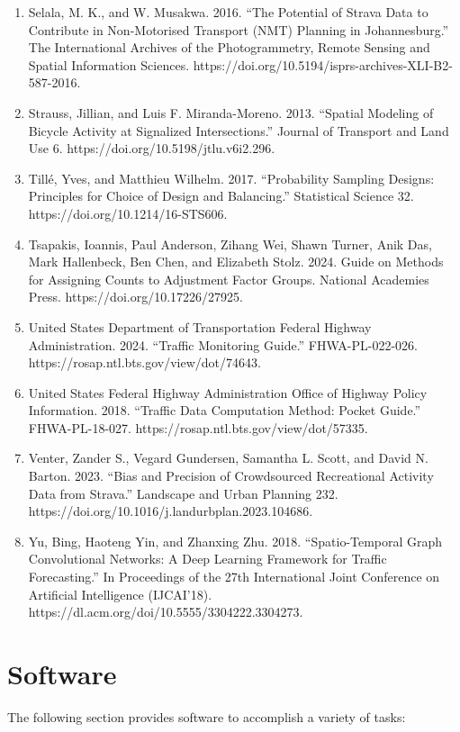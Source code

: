 \documentclass[11pt]{article}
\begin{document}
\begin{enumerate}
\item
  Selala, M. K., and W. Musakwa. 2016. ``The Potential of Strava Data to
  Contribute in Non-Motorised Transport (NMT) Planning in
  Johannesburg.'' The International Archives of the Photogrammetry,
  Remote Sensing and Spatial Information Sciences.
  https://doi.org/10.5194/isprs-archives-XLI-B2-587-2016.
\item
  Strauss, Jillian, and Luis F. Miranda-Moreno. 2013. ``Spatial Modeling
  of Bicycle Activity at Signalized Intersections.'' Journal of
  Transport and Land Use 6. https://doi.org/10.5198/jtlu.v6i2.296.
\item
  Tillé, Yves, and Matthieu Wilhelm. 2017. ``Probability Sampling
  Designs: Principles for Choice of Design and Balancing.'' Statistical
  Science 32. https://doi.org/10.1214/16-STS606.
\item
  Tsapakis, Ioannis, Paul Anderson, Zihang Wei, Shawn Turner, Anik Das,
  Mark Hallenbeck, Ben Chen, and Elizabeth Stolz. 2024. Guide on Methods
  for Assigning Counts to Adjustment Factor Groups. National Academies
  Press. https://doi.org/10.17226/27925.
\item
  United States Department of Transportation Federal Highway
  Administration. 2024. ``Traffic Monitoring Guide.'' FHWA-PL-022-026.
  https://rosap.ntl.bts.gov/view/dot/74643.
\item
  United States Federal Highway Administration Office of Highway Policy
  Information. 2018. ``Traffic Data Computation Method: Pocket Guide.''
  FHWA-PL-18-027. https://rosap.ntl.bts.gov/view/dot/57335.
\item
  Venter, Zander S., Vegard Gundersen, Samantha L. Scott, and David N.
  Barton. 2023. ``Bias and Precision of Crowdsourced Recreational
  Activity Data from Strava.'' Landscape and Urban Planning 232.
  https://doi.org/10.1016/j.landurbplan.2023.104686.
\item
  Yu, Bing, Haoteng Yin, and Zhanxing Zhu. 2018. ``Spatio-Temporal Graph
  Convolutional Networks: A Deep Learning Framework for Traffic
  Forecasting.'' In Proceedings of the 27th International Joint
  Conference on Artificial Intelligence (IJCAI'18).
  https://dl.acm.org/doi/10.5555/3304222.3304273.
\end{enumerate}

    \section{Software}\label{software}

The following section provides software to accomplish a variety of
tasks:
\end{document}

